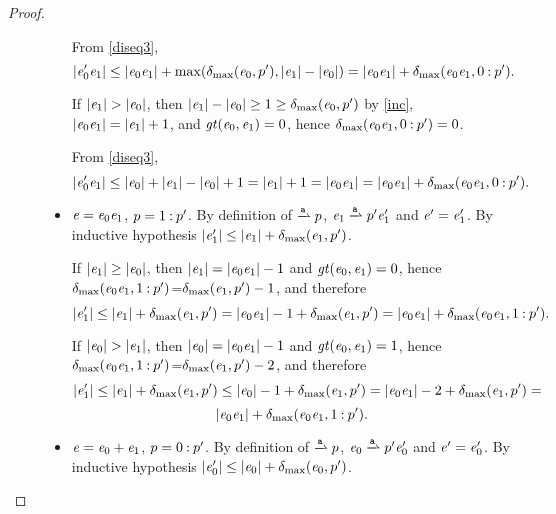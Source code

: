 \begin{theorem}
\begin{proof}
\begin{description}
\begin{itemize}
           From \cref{diseq3},
           $$
            {\mid}{\mathit {e}'_0\mathit {e}_1}{\mid}\leq{\mid}{\ensuremath{\mathit {e}}_0\ensuremath{\mathit {e}}_1}{\mid}+\max({\delta_{\max}}({\mathit {e}_0},{p'}),{\mid}{\mathit {e}_1}{\mid}-{\mid}{\mathit {e}_0}{\mid})
            ={\mid}{\mathit {e}_0\mathit {e}_1}{\mid}+{\delta_{\max}}({\mathit {e}_0\mathit {e}_1},{0\mathbin{:}p'}).$$

           If ${\mid}{\mathit {e}_1}{\mid}>{\mid}{\mathit {e}_0}{\mid}$, then ${\mid}{\mathit {e}_1}{\mid}-{\mid}{\mathit {e}_0}{\mid}\geq 1\geq {\delta_{\max}}({\mathit {e}_0},{p'})$
           by \cref{inc}, ${\mid}{\mathit {e}_0\mathit {e}_1}{\mid}={\mid}{\mathit {e}_1}{\mid}+1$, and $\mathit{gt}({\mathit {e}_0},{\mathit {e}_1})=0$, hence
           ${\delta_{\max}}({\mathit {e}_0\mathit {e}_1},{0\mathbin{:}p'})=0$.

           From \cref{diseq3},
           $$
            {\mid}{\mathit {e}'_0\mathit {e}_1}{\mid}\leq{\mid}{\ensuremath{\mathit {e}}_0}{\mid}+{\mid}{\mathit {e}_1}{\mid}-{\mid}{\mathit {e}_0}{\mid}+1={\mid}{\mathit {e}_1}{\mid}+1=
            {\mid}{\mathit {e}_0\mathit {e}_1}{\mid}={\mid}{\mathit {e}_0\mathit {e}_1}{\mid}+{\delta_{\max}}({\mathit {e}_0\mathit {e}_1},{0\mathbin{:}p'}).$$

     \item $\mathit {e}=\mathit {e}_0\mathit {e}_1$, $p=1\mathbin{:}p'$. By definition
           of $\parDer{\sym}{\tpath}$, $\re_1\parDer{\sym}{\tpath'}\re'_1$ and $\mathit {e}'=\mathit {e}'_1$.
           By inductive hypothesis ${\mid}{\mathit {e}'_1}{\mid}\leq {\mid}{\ensuremath{\mathit {e}}_1}{\mid}+{\delta_{\max}}({\mathit {e}_1},{p'})$.

           If ${\mid}{\mathit {e}_1}{\mid}\geq{\mid}{\ensuremath{\mathit {e}}_0}{\mid}$, then ${\mid}{\mathit {e}_1}{\mid}={\mid}{\mathit {e}_0\mathit {e}_1}{\mid}-1$ and
           $\mathit{gt}({\mathit {e}_0},{\mathit {e}_1})=0$, hence
           ${\delta_{\max}}({\mathit {e}_0\mathit {e}_1},{1\mathbin{:}p'})$=${\delta_{\max}}({\mathit {e}_1},{p'})-1$,  and therefore
           $$
            {\mid}{\mathit {e}'_1}{\mid}\leq{\mid}{\ensuremath{\mathit {e}}_1}{\mid}+{\delta_{\max}}({\mathit {e}_1},{p'})=
            {\mid}{\mathit {e}_0\mathit {e}_1}{\mid}-1+{\delta_{\max}}({\mathit {e}_1},{p'})=
            {\mid}{\mathit {e}_0\mathit {e}_1}{\mid}+{\delta_{\max}}({\mathit {e}_0\mathit {e}_1},{1\mathbin{:}p'}).
           $$

           If ${\mid}{\mathit {e}_0}{\mid}>{\mid}{\mathit {e}_1}{\mid}$, then ${\mid}{\mathit {e}_0}{\mid}={\mid}{\mathit {e}_0\mathit {e}_1}{\mid}-1$ and
           $\mathit{gt}({\mathit {e}_0},{\mathit {e}_1})=1$, hence
           ${\delta_{\max}}({\mathit {e}_0\mathit {e}_1},{1\mathbin{:}p'})$=${\delta_{\max}}({\mathit {e}_1},{p'})-2$,  and therefore
           $$
            {\mid}{\mathit {e}'_1}{\mid}\leq{\mid}{\ensuremath{\mathit {e}}_1}{\mid}+{\delta_{\max}}({\mathit {e}_1},{p'})\leq
            {\mid}{\ensuremath{\mathit {e}}_0}{\mid}-1+{\delta_{\max}}({\mathit {e}_1},{p'})=
            {\mid}{\mathit {e}_0\mathit {e}_1}{\mid}-2+{\delta_{\max}}({\mathit {e}_1},{p'})=$$
           $$
            {\mid}{\mathit {e}_0\mathit {e}_1}{\mid}+{\delta_{\max}}({\mathit {e}_0\mathit {e}_1},{1\mathbin{:}p'}).
           $$

     \item $\mathit {e}=\mathit {e}_0\mathbin{+}\mathit {e}_1$, $p=0\mathbin{:}p'$. By definition
           of $\parDer{\sym}{\tpath}$, $\re_0\parDer{\sym}{\tpath'}\re'_0$ and $\mathit {e}'=\mathit {e}'_0$.
           By inductive hypothesis ${\mid}{\mathit {e}'_0}{\mid}\leq {\mid}{\ensuremath{\mathit {e}}_0}{\mid}+{\delta_{\max}}({\mathit {e}_0},{p'})$.


\end{itemize}
\end{description}
\end{proof}
\end{theorem}
